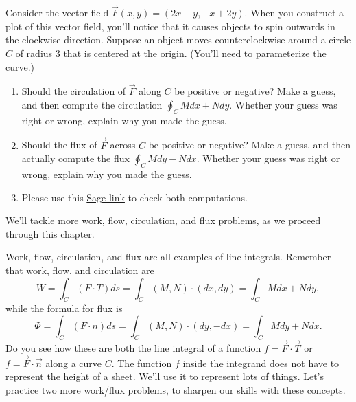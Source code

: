\begin{problem}
%
 Consider the vector field $\vec F(x,y) = (2x+y,-x+2y)$. When you construct a plot of this vector field, you'll notice that it causes objects to spin outwards in the clockwise direction. Suppose an object moves counterclockwise around a circle $C$ of radius 3 that is centered at the origin. (You'll need to parameterize the curve.)
\begin{enumerate}
 \item Should the circulation of $\vec F$ along $C$ be positive or negative?  Make a guess, and then compute the circulation $\oint_C Mdx+Ndy$. Whether your guess was right or wrong, explain why you made the guess. 
 \item Should the flux of $\vec F$ across $C$ be positive or negative? Make a guess, and then actually compute the flux $\oint_C Mdy-Ndx$. Whether your guess was right or wrong, explain why you made the guess. 
 \item Please use this \href{\sageworkfluxurl}{Sage link} to check both computations. 
\end{enumerate}
\end{problem}

We'll tackle more work, flow, circulation, and flux problems, as we proceed through this chapter.


















Work, flow, circulation, and flux are all examples of line integrals.  Remember that work, flow, and circulation are 
$$W=\int_C (F\cdot T)ds =\int_C (M,N)\cdot(dx,dy) =  \int_C Mdx+Ndy,$$
while the formula for flux is
$$\Phi=\int_C (F\cdot n)ds =\int_C (M,N)\cdot(dy,-dx) =  \int_C Mdy+Ndx.$$
Do you see how these are both the line integral of a function $f = \vec F\cdot \vec T$ or $f=\vec F\cdot \vec n$ along a curve $C$.  The function $f$ inside the integrand does not have to represent the height of a sheet. We'll use it to represent lots of things.  Let's practice two more work/flux problems, to sharpen our skills with these concepts. 






